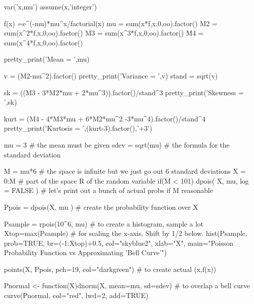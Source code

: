 \documentclass[10pt,]{book}
\numberwithin{equation}{section}
\begin{document}
\leavevmode%
\begin{sageinput}
var('x,mu')
assume(x,'integer')

f(x) =e^(-mu)*mu^x/factorial(x)
mu = sum(x*f,x,0,oo).factor()
M2 = sum(x^2*f,x,0,oo).factor()
M3 = sum(x^3*f,x,0,oo).factor()
M4 = sum(x^4*f,x,0,oo).factor()

pretty_print('Mean = ',mu)

v = (M2-mu^2).factor()
pretty_print('Variance = ',v)
stand = sqrt(v)

sk = ((M3 - 3*M2*mu + 2*mu^3)).factor()/stand^3
pretty_print('Skewness = ',sk)

kurt = (M4 - 4*M3*mu + 6*M2*mu^2 -3*mu^4).factor()/stand^4
pretty_print('Kurtosis = ',(kurt-3).factor(),'+3')
\end{sageinput}
%
\par
\hypertarget{p-1075}{}%
\leavevmode%
\begin{sageinput}
mu = 3           # the mean must be given
sdev = sqrt(mu)  # the formula for the standard deviation

M = mu*6   # the space is infinite but we just go out 6 standard deviations
X = 0:M    # part of the space R of the random variable 
if(M < 101){
dpois( X, mu, log = FALSE )   # let's print out a bunch of actual probs if M reasonable
}

Ppois = dpois(X, mu )  # create the probability function over X

Psample = rpois(10^6, mu)  # to create a histogram, sample a lot
Xtop=max(Psample)          # for scaling the x-axis. Shift by 1/2 below.
hist(Psample, prob=TRUE, br=(-1:Xtop)+0.5, col="skyblue2", xlab="X", 
  main="Poisson Probability Function vs Approximating 'Bell Curve'")

points(X, Ppois, pch=19, col="darkgreen")  # to create actual (x,f(x))

Pnormal <- function(X){dnorm(X, mean=mu, sd=sdev)}   # to overlap a bell curve
curve(Pnormal, col="red", lwd=2, add=TRUE)
\end{sageinput}
%
%
%
\typeout{************************************************}
\typeout{************************************************}
%
\end{document}
